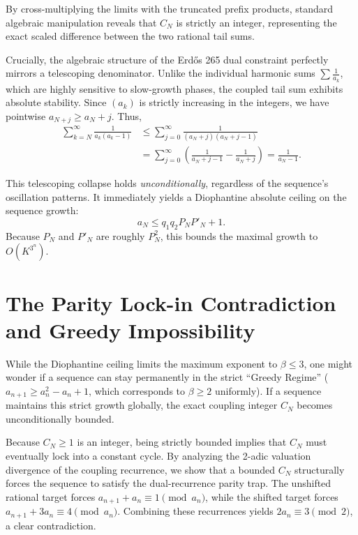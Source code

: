 \documentclass[11pt,reqno]{amsart}
\theoremstyle{definition}
\begin{document}
By cross-multiplying the limits with the truncated prefix products, standard algebraic manipulation reveals that $C_N$ is strictly an integer, representing the exact scaled difference between the two rational tail sums. 

Crucially, the algebraic structure of the Erd\H{o}s 265 dual constraint perfectly mirrors a telescoping denominator. Unlike the individual harmonic sums $\sum \frac{1}{a_k}$, which are highly sensitive to slow-growth phases, the coupled tail sum exhibits absolute stability. Since $(a_k)$ is strictly increasing in the integers, we have pointwise $a_{N+j} \ge a_N + j$. Thus,
\begin{align*}
\sum_{k=N}^\infty \frac{1}{a_k(a_k-1)} &\le \sum_{j=0}^\infty \frac{1}{(a_N + j)(a_N + j - 1)} \\
&= \sum_{j=0}^\infty \left( \frac{1}{a_N + j - 1} - \frac{1}{a_N + j} \right) = \frac{1}{a_N - 1}.
\end{align*}

This telescoping collapse holds \emph{unconditionally}, regardless of the sequence's oscillation patterns. It immediately yields a Diophantine absolute ceiling on the sequence growth:
\begin{equation}
a_N \le q_1 q_2 P_N P'_N + 1.
\end{equation}
Because $P_N$ and $P'_N$ are roughly $P_N^2$, this bounds the maximal growth to $O(K^{3^n})$. 

\section{The Parity Lock-in Contradiction and Greedy Impossibility}

While the Diophantine ceiling limits the maximum exponent to $\beta \le 3$, one might wonder if a sequence can stay permanently in the strict ``Greedy Regime'' ($a_{n+1} \ge a_n^2 - a_n + 1$, which corresponds to $\beta \ge 2$ uniformly). If a sequence maintains this strict growth globally, the exact coupling integer $C_N$ becomes unconditionally bounded.

Because $C_N \ge 1$ is an integer, being strictly bounded implies that $C_N$ must eventually lock into a constant cycle. By analyzing the 2-adic valuation divergence of the coupling recurrence, we show that a bounded $C_N$ structurally forces the sequence to satisfy the dual-recurrence parity trap. The unshifted rational target forces $a_{n+1} + a_n \equiv 1 \pmod{a_n}$, while the shifted target forces $a_{n+1} + 3a_n \equiv 4 \pmod{a_n}$. Combining these recurrences yields $2a_n \equiv 3 \pmod{2}$, a clear contradiction. 
\end{document}
